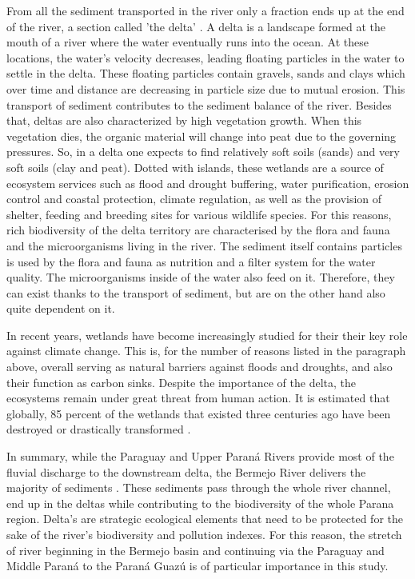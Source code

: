 From all the sediment transported in the river only a fraction ends up at the end of the river, a section called 'the delta' \autocite{academialabParanaDelta}. A delta is a landscape formed at the mouth of a river where the water eventually runs into the ocean. At these locations, the water's velocity decreases, leading floating particles in the water to settle in the delta. These floating particles contain gravels, sands and clays which over time and distance are decreasing in particle size due to mutual erosion. This transport of sediment contributes to the sediment balance of the river. Besides that, deltas are also characterized by high vegetation growth. When this vegetation dies, the organic material will change into peat due to the governing pressures. So, in a delta one expects to find relatively soft soils (sands) and very soft soils (clay and peat). Dotted with islands, these wetlands are a source of ecosystem services such as flood and drought buffering, water purification, erosion control and coastal protection, climate regulation, as well as the provision of shelter, feeding and breeding sites for various wildlife species. For this reasons, rich biodiversity of the delta territory are characterised by the flora and fauna and the microorganisms living in the river. The sediment itself contains particles is used by the flora and fauna as nutrition and a filter system for the water quality. The microorganisms inside of the water also feed on it. 
Therefore, they can exist thanks to the transport of sediment, but are on the other hand also quite dependent on it\autocite{hibaParanaRiverEcological2024}.

In recent years, wetlands have become increasingly studied for their their key role against climate change. This is, for the number of reasons listed in the paragraph above, overall serving as natural barriers against floods and droughts, and also their function as carbon sinks. Despite the importance of the delta, the ecosystems remain under great threat from human action. It is estimated that globally, 85 percent of the wetlands that existed three centuries ago have been destroyed or drastically transformed \autocite{hibaParanaRiverEcological2024}.

In summary, while the Paraguay and Upper Paraná Rivers provide most of the fluvial discharge to the downstream delta, the Bermejo River delivers the majority of sediments \autocite{lopezweibelSourcesTemporalDynamics2022}. These sediments pass through the whole river channel, end up in the deltas while contributing to the biodiversity of the whole Parana region. Delta's are strategic ecological elements that need to be protected for the sake of the river's biodiversity and pollution indexes. For this reason, the stretch of river beginning in the Bermejo basin and continuing via the Paraguay and Middle Paraná to the Paraná Guazú is of particular importance in this study. 


